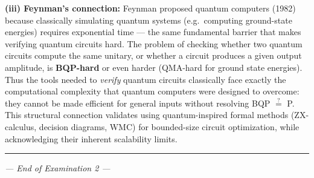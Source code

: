 \documentclass[12pt,a4paper]{exam}
\begin{document}
\begin{questions}
\begin{parts}
\begin{solution}
\textbf{(iii) Feynman's connection:}
Feynman proposed quantum computers (1982) because classically simulating quantum systems (e.g.\ computing ground-state energies) requires exponential time --- the same fundamental barrier that makes verifying quantum circuits hard.
The problem of checking whether two quantum circuits compute the same unitary, or whether a circuit produces a given output amplitude, is \textbf{BQP-hard} or even harder (QMA-hard for ground state energies). Thus the tools needed to \emph{verify} quantum circuits classically face exactly the computational complexity that quantum computers were designed to overcome: they cannot be made efficient for general inputs without resolving BQP $\stackrel{?}{=}$ P. This structural connection validates using quantum-inspired formal methods (ZX-calculus, decision diagrams, WMC) for bounded-size circuit optimization, while acknowledging their inherent scalability limits.
\end{solution}

\end{parts}

\end{questions}

\bigskip\hrule
\begin{center}
\textit{--- End of Examination 2 ---}
\end{center}
\end{document}
